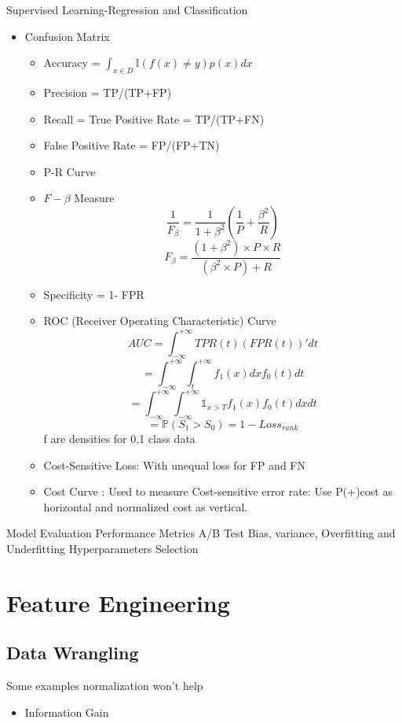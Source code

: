 \documentclass[11pt, openany]{book}              %
\begin{document}
Supervised Learning-Regression and Classification
\begin{itemize}
    \item Confusion Matrix
    \begin{itemize}
    	\item Accuracy = $\int_{x\in D} \mathbb{I}(f(x)\neq y) p(x)dx$
    	\item Precision = TP/(TP+FP)
    	\item Recall = True Positive Rate = TP/(TP+FN)
    	\item False Positive Rate = FP/(FP+TN)
    	\item P-R Curve
    	\item $F-\beta$ Measure
    	$$\frac{1}{F_{\beta}} = \frac{1}{1+\beta^2}(\frac{1}{P}+\frac{\beta^2}{R})$$
    	$${F_{\beta}} = \frac{(1+\beta^2) \times P \times R}{(\beta^2 \times P) + R}$$
    	\item Specificity = 1- FPR
    	\item ROC (Receiver Operating Characteristic) Curve
    	$$AUC = \int_{-\infty}^{+\infty}  TPR(t)(FPR(t))'dt$$
    	$$ = \int_{-\infty}^{+\infty} \int_{t}^{+\infty} f_1(x)dxf_0(t)dt$$
    	$$ = \int_{-\infty}^{+\infty}\int_{-\infty}^{+\infty} \mathbb{1}_{x>T} f_1(x) f_0(t)dxdt$$
    	$$ = \mathbb{P}(S_1 > S_0) = 1-Loss_{rank}$$ f are densities for 0,1 class data
    	\item Cost-Sensitive Loss: With unequal loss for FP and FN
    	\item Cost Curve : Used to measure Cost-sensitive error rate: Use P(+)cost as horizontal and normalized cost as vertical. 
    	
    \end{itemize}
\end{itemize}

Model Evaluation
	Performance Metrics
	A/B Test
	Bias, variance, Overfitting and Underfitting
	Hyperparameters Selection

\chapter{Feature Engineering}

\section{Data Wrangling}

Some examples normalization won't help

\begin{itemize}
	\item Information Gain
\end{itemize}
\end{document}
